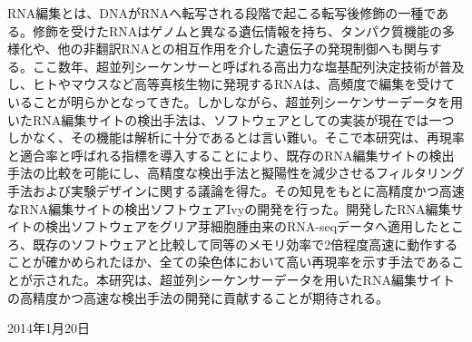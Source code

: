 \begin{jabstract}
RNA編集とは、DNAがRNAへ転写される段階で起こる転写後修飾の一種である。修飾を受けたRNAはゲノムと異なる遺伝情報を持ち、タンパク質機能の多様化や、他の非翻訳RNAとの相互作用を介した遺伝子の発現制御へも関与する。ここ数年、超並列シーケンサーと呼ばれる高出力な塩基配列決定技術が普及し、ヒトやマウスなど高等真核生物に発現するRNAは、高頻度で編集を受けていることが明らかとなってきた。しかしながら、超並列シーケンサーデータを用いたRNA編集サイトの検出手法は、ソフトウェアとしての実装が現在では一つしかなく、その機能は解析に十分であるとは言い難い。そこで本研究は、再現率と適合率と呼ばれる指標を導入することにより、既存のRNA編集サイトの検出手法の比較を可能にし、高精度な検出手法と擬陽性を減少させるフィルタリング手法および実験デザインに関する議論を得た。その知見をもとに高精度かつ高速なRNA編集サイトの検出ソフトウェアIvyの開発を行った。開発したRNA編集サイトの検出ソフトウェアをグリア芽細胞腫由来のRNA-seqデータへ適用したところ、既存のソフトウェアと比較して同等のメモリ効率で2倍程度高速に動作することが確かめられたほか、全ての染色体において高い再現率を示す手法であることが示された。本研究は、超並列シーケンサーデータを用いたRNA編集サイトの高精度かつ高速な検出手法の開発に貢献することが期待される。
\end{jabstract}

\begin{flushright}
	\par
	2014年1月20日
\end{flushright}